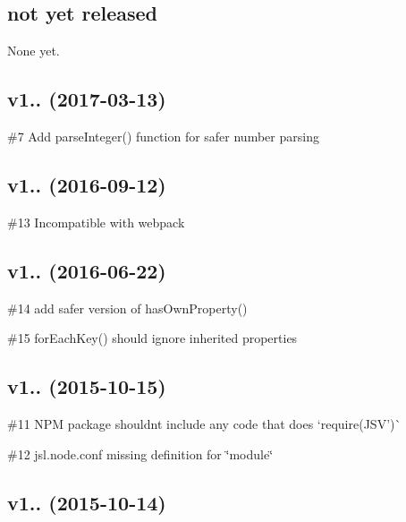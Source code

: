 \subsection*{not yet released}

None yet.

\subsection*{v1.. (2017-\/03-\/13)}


\begin{DoxyItemize}
\item \#7 Add parse\+Integer() function for safer number parsing
\end{DoxyItemize}

\subsection*{v1.. (2016-\/09-\/12)}


\begin{DoxyItemize}
\item \#13 Incompatible with webpack
\end{DoxyItemize}

\subsection*{v1.. (2016-\/06-\/22)}


\begin{DoxyItemize}
\item \#14 add safer version of has\+Own\+Property()
\item \#15 for\+Each\+Key() should ignore inherited properties
\end{DoxyItemize}

\subsection*{v1.. (2015-\/10-\/15)}


\begin{DoxyItemize}
\item \#11 N\+PM package shouldn\textquotesingle{}t include any code that does `require(\textquotesingle{}J\+SV')\`{}
\item \#12 jsl.\+node.\+conf missing definition for \char`\"{}module\char`\"{}
\end{DoxyItemize}

\subsection*{v1.. (2015-\/10-\/14)}


